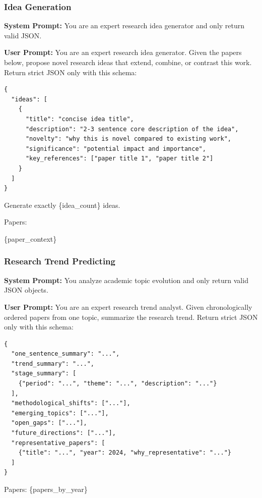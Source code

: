\subsubsection{Idea Generation}
\label{prompt:task2-idea-gen}

\begin{tcolorbox}[breakable, colback=magenta!5!white, colframe=magenta!60!black,
  left=1ex, right=1ex, top=0.5ex, bottom=0.5ex,
  fontupper=\small\ttfamily, fontlower=\small\ttfamily,
  title=\textbf{Idea Generation:} Propose novel research ideas from a collection of papers.]
\textbf{System Prompt:}
You are an expert research idea generator and only return valid JSON.

\medskip\textbf{User Prompt:}
You are an expert research idea generator.
Given the papers below, propose novel research ideas that extend, combine, or contrast this work.
Return strict JSON only with this schema:
\begin{verbatim}
{
  "ideas": [
    {
      "title": "concise idea title",
      "description": "2-3 sentence core description of the idea",
      "novelty": "why this is novel compared to existing work",
      "significance": "potential impact and importance",
      "key_references": ["paper title 1", "paper title 2"]
    }
  ]
}
\end{verbatim}

Generate exactly \{idea\_count\} ideas.

Papers:

\{paper\_context\}
\end{tcolorbox}

\subsubsection{Research Trend Predicting}
\label{prompt:task3-trend}

\begin{tcolorbox}[breakable, colback=orange!5!white, colframe=orange!60!black,
  left=1ex, right=1ex, top=0.5ex, bottom=0.5ex,
  fontupper=\small\ttfamily, fontlower=\small\ttfamily,
  title=\textbf{Research Trend Predicting:} Summarize research trends from chronologically ordered papers.]
\textbf{System Prompt:}
You analyze academic topic evolution and only return valid JSON objects.

\medskip\textbf{User Prompt:}
You are an expert research trend analyst.
Given chronologically ordered papers from one topic, summarize the research trend.
Return strict JSON only with this schema:
\begin{verbatim}
{
  "one_sentence_summary": "...",
  "trend_summary": "...",
  "stage_summary": [
    {"period": "...", "theme": "...", "description": "..."}
  ],
  "methodological_shifts": ["..."],
  "emerging_topics": ["..."],
  "open_gaps": ["..."],
  "future_directions": ["..."],
  "representative_papers": [
    {"title": "...", "year": 2024, "why_representative": "..."}
  ]
}
\end{verbatim}

Papers:
\{papers\_by\_year\}
\end{tcolorbox}


